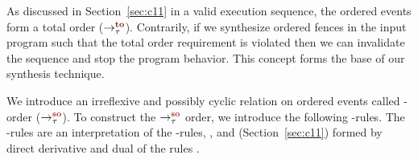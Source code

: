 As discussed in Section~\ref{sec:c11} in a valid \cc execution 
sequence, the \sc ordered events form a total order ($\setTO$).
%
Contrarily, if we synthesize \sc ordered fences in the input program 
such that the total order requirement is violated then we can
invalidate the sequence and stop the program behavior.
This concept forms the base of our synthesis technique.

We introduce an irreflexive and possibly cyclic relation
on \sc ordered events called \sc-order ($\setSO$).
%
To construct the $\setSO$ order, we introduce the following \lso-rules.
The \lso-rules are an interpretation of the \lto-rules, ,
 and  (Section~\ref{sec:c11}) 
formed by direct derivative and dual of the rules .

